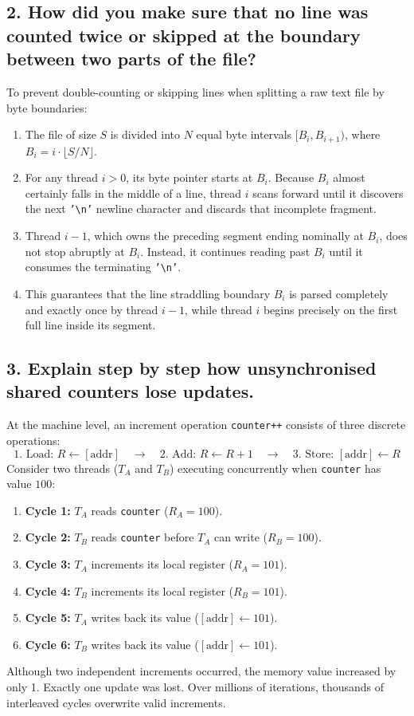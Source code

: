 \documentclass[12pt,a4paper]{article}
\begin{document}
\subsection{2. How did you make sure that no line was counted twice or skipped at the boundary between two parts of the file?}
To prevent double-counting or skipping lines when splitting a raw text file by byte boundaries:
\begin{enumerate}
    \item The file of size $S$ is divided into $N$ equal byte intervals $[B_i, B_{i+1})$, where $B_i = i \cdot \lfloor S/N \rfloor$.
    \item For any thread $i > 0$, its byte pointer starts at $B_i$. Because $B_i$ almost certainly falls in the middle of a line, thread $i$ scans forward until it discovers the next \texttt{'\textbackslash n'} newline character and discards that incomplete fragment.
    \item Thread $i-1$, which owns the preceding segment ending nominally at $B_i$, does not stop abruptly at $B_i$. Instead, it continues reading past $B_i$ until it consumes the terminating \texttt{'\textbackslash n'}.
    \item This guarantees that the line straddling boundary $B_i$ is parsed completely and exactly once by thread $i-1$, while thread $i$ begins precisely on the first full line inside its segment.
\end{enumerate}

\subsection{3. Explain step by step how unsynchronised shared counters lose updates.}
At the machine level, an increment operation \texttt{counter++} consists of three discrete operations:
\begin{equation*}
    \text{1. Load: } R \leftarrow [\text{addr}] \quad \longrightarrow \quad \text{2. Add: } R \leftarrow R + 1 \quad \longrightarrow \quad \text{3. Store: } [\text{addr}] \leftarrow R
\end{equation*}
Consider two threads ($T_A$ and $T_B$) executing concurrently when \texttt{counter} has value $100$:
\begin{enumerate}
    \item \textbf{Cycle 1:} $T_A$ reads \texttt{counter} ($R_A = 100$).
    \item \textbf{Cycle 2:} $T_B$ reads \texttt{counter} before $T_A$ can write ($R_B = 100$).
    \item \textbf{Cycle 3:} $T_A$ increments its local register ($R_A = 101$).
    \item \textbf{Cycle 4:} $T_B$ increments its local register ($R_B = 101$).
    \item \textbf{Cycle 5:} $T_A$ writes back its value ($[\text{addr}] \leftarrow 101$).
    \item \textbf{Cycle 6:} $T_B$ writes back its value ($[\text{addr}] \leftarrow 101$).
\end{enumerate}
Although two independent increments occurred, the memory value increased by only 1. Exactly one update was lost. Over millions of iterations, thousands of interleaved cycles overwrite valid increments.
\end{document}
